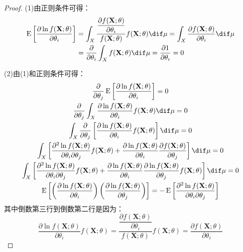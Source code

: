 \begin{proof}
	(1)由正则条件可得：
	\begin{align*}
		\operatorname{E}\left[\frac{\partial\ln f(\mathbf{X};\theta)}{\partial\theta_i}\right]
		&=\int_{X}\frac{\dfrac{\partial f(\mathbf{X};\theta)}{\partial\theta_i}}{f(\mathbf{X};\theta)}f(\mathbf{X};\theta)\dif\mu
		=\int_{X}\frac{\partial f(\mathbf{X};\theta)}{\partial\theta_i}\dif\mu \\
		&=\frac{\partial}{\partial\theta_i}\int_{X}f(\mathbf{X};\theta)\dif\mu
		=\frac{\partial1}{\partial\theta_i}=0
	\end{align*}\par
	(2)由(1)和正则条件可得：
	\begin{gather*}
		\frac{\partial}{\partial\theta_j}\operatorname{E}\left[\frac{\partial\ln f(\mathbf{X};\theta)}{\partial\theta_i}\right]=0 \\
		\frac{\partial}{\partial\theta_j}\int_{X}\frac{\partial\ln f(\mathbf{X};\theta)}{\partial\theta_i}f(\mathbf{X};\theta)\dif\mu=0 \\
		\int_{X}\frac{\partial}{\partial\theta_j}\left[\frac{\partial\ln f(\mathbf{X};\theta)}{\partial\theta_i}f(\mathbf{X};\theta)\right]\dif\mu=0 \\
		\int_{X}\left[\frac{\partial^2\ln f(\mathbf{X};\theta)}{\partial\theta_i\partial\theta_j}f(\mathbf{X};\theta)+\frac{\partial\ln f(\mathbf{X};\theta)}{\partial\theta_i}\frac{\partial f(\mathbf{X};\theta)}{\partial\theta_j}\right]\dif\mu=0 \\
		\int_{X}\left[\frac{\partial^2\ln f(\mathbf{X};\theta)}{\partial\theta_i\partial\theta_j}f(\mathbf{X};\theta)+\frac{\partial\ln f(\mathbf{X};\theta)}{\partial\theta_i}\frac{\partial \ln f(\mathbf{X};\theta)}{\partial\theta_j}f(\mathbf{X};\theta)\right]\dif\mu=0 \\
		\operatorname{E}\left[\left(\frac{\partial\ln f(\mathbf{X};\theta)}{\partial\theta_i}\right)\left(\frac{\partial\ln f(\mathbf{X};\theta)}{\partial\theta_j}\right)\right]=-\operatorname{E}\left[\frac{\partial^2\ln f(\mathbf{X};\theta)}{\partial\theta_i\partial\theta_j}\right]
	\end{gather*}
	其中倒数第三行到倒数第二行是因为：
	\begin{equation*}
		\frac{\partial\ln f(\mathbf{X};\theta)}{\partial\theta_i}f(\mathbf{X};\theta)=\frac{\dfrac{\partial f(\mathbf{X};\theta)}{\partial\theta_i}}{f(\mathbf{X};\theta)}f(\mathbf{X};\theta)=\dfrac{\partial f(\mathbf{X};\theta)}{\partial\theta_i}
	\end{equation*}
\end{proof}